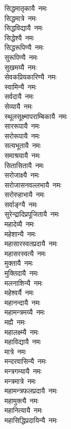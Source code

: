 \begin{flushleft}
\begin{multicols}{2}
सिद्धमातृकायै~नमः\\
सिद्धमात्रे~नमः\\
सिद्धविद्यायै~नमः\\
सिद्धेश्यै~नमः\hfill{}\\
सिद्धरूपिण्यै~नमः\\
सुरूपिण्यै~नमः\\
सुखमय्यै~नमः\\
सेवकप्रियकारिण्यै~नमः\\
स्वामिन्यै~नमः\\
सर्वदायै~नमः\\
सेव्यायै~नमः\\
स्थूलसूक्ष्मापराम्बिकायै~नमः\\
साररूपायै~नमः\\
सरोरूपायै~नमः\hfill{}\\
सत्यभूतायै~नमः\\
समाश्रयायै~नमः\\
सितासितायै~नमः\\
सरोजाक्ष्यै~नमः\\
सरोजासनवल्लभायै~नमः\\
सरोरुहाभायै~नमः\\
सर्वाङ्ग्यै~नमः\\
सुरेन्द्रादिप्रपूजितायै~नमः\\
महादेव्यै~नमः\\
महेशान्यै~नमः\hfill{}\\
महासारस्वतप्रदायै~नमः\\
महासरस्वत्यै~नमः\\
मुक्तायै~नमः\\
मुक्तिदायै~नमः\\
मलनाशिन्यै~नमः\\
महेश्वर्यै~नमः\\
महानन्दायै~नमः\\
महामन्त्रमय्यै~नमः\\
मह्यै~नमः\\
महालक्ष्म्यै~नमः\hfill{}\\
महाविद्यायै~नमः\\
मात्रे~नमः\\
मन्दरवासिन्यै~नमः\\
मन्त्रगम्यायै~नमः\\
मन्त्रमात्रे~नमः\\
महामन्त्रफलप्रदायै~नमः\\
महामुक्त्यै~नमः\\
महानित्यायै~नमः\\
महासिद्धिप्रदायिन्यै~नमः\\

\end{multicols}
\end{flushleft}
